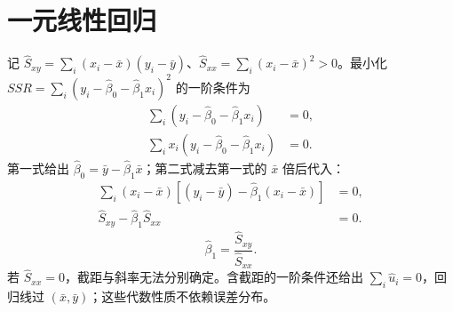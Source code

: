 \section{一元线性回归}\label{sec:ols-slope}
\label{sec:prf-srf}
\label{sec:foc}
\begin{proofbox}[title=推导]
记 $\hat S_{xy}=\sum_i(x_i-\bar x)(y_i-\bar y)$、$\hat S_{xx}=\sum_i(x_i-\bar x)^2>0$。最小化 $SSR=\sum_i(y_i-\hat\beta_0-\hat\beta_1x_i)^2$ 的一阶条件为
\begin{align*}
\sum_i(y_i-\hat\beta_0-\hat\beta_1x_i)&=0,\\
\sum_ix_i(y_i-\hat\beta_0-\hat\beta_1x_i)&=0.
\end{align*}
第一式给出 $\hat\beta_0=\bar y-\hat\beta_1\bar x$；第二式减去第一式的 $\bar x$ 倍后代入：
\begin{align*}
\sum_i(x_i-\bar x)[(y_i-\bar y)-\hat\beta_1(x_i-\bar x)]&=0,\\
\hat S_{xy}-\hat\beta_1\hat S_{xx}&=0.
\end{align*}
\begin{equation}
\hat\beta_1=\frac{\hat S_{xy}}{\hat S_{xx}}.\label{eq:ols-slope}
\end{equation}
若 $\hat S_{xx}=0$，截距与斜率无法分别确定。含截距的一阶条件还给出 $\sum_i\hat u_i=0$，回归线过 $(\bar x,\bar y)$；这些代数性质不依赖误差分布。
\end{proofbox}
